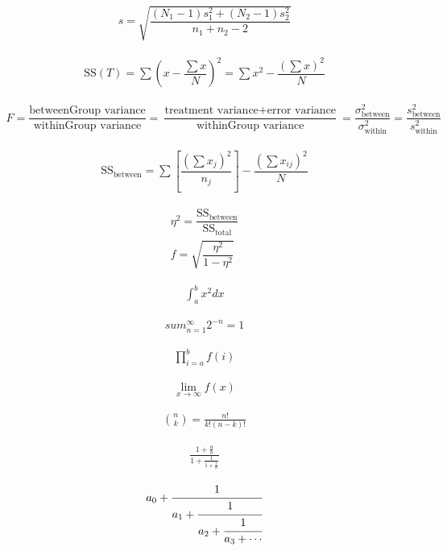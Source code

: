 \documentclass{article}
\begin{document}
\begin{align*}
s=\sqrt{\dfrac{(N_1-1)s_1^2+(N_2-1)s_2^2}{n_1+n_2-2}}
\end{align*}

\begin{align*}
\text{SS}(T)=\displaystyle\sum{\left(x-\dfrac{\sum{x}}{N}\right)^2}=\displaystyle\sum{x^2-\dfrac{\left(\sum{x}\right)^2}{N}}
\end{align*}

\begin{align*}
F=\dfrac{\text{betweenGroup variance}}{\text{withinGroup variance}}=\dfrac{\text{treatment variance}+\text{error variance}}{\text{withinGroup variance}}=\dfrac{\sigma^2_\text{between}}{\sigma^2_\text{within}}=\dfrac{s^2_\text{between}}{s^2_\text{within}}
\end{align*}

\begin{align*}
\text{SS}_\text{between}=\displaystyle\sum{\left[\dfrac{\left(\sum{x_j}\right)^2}{n_j}\right]}-\dfrac{(\sum{x_{ij}})^2}{N}
\end{align*}

\begin{align*}
\eta^2=\dfrac{\text{SS}_\text{between}}{\text{SS}_\text{total}} \\ f=\sqrt{\dfrac{\eta^2}{1-\eta^2}}
\end{align*}

\begin{align*}
\int_{a}^{b} x^2 dx
\end{align*}

\begin{align*}
sum_{n=1}^{\infty} 2^{-n} = 1
\end{align*}

\begin{align*}
\prod_{i=a}^{b} f(i)
\end{align*}

\begin{align*}
\lim_{x\to\infty} f(x)
\end{align*}

\begin{align*}
\binom{n}{k} = \frac{n!}{k!(n-k)!}
\end{align*}

\begin{align*}
\frac{1+\frac{a}{b}}{1+\frac{1}{1+\frac{1}{a}}}
\end{align*}

\begin{align*}
a_0+\cfrac{1}{a_1+\cfrac{1}{a_2+\cfrac{1}{a_3+\cdots}}}
\end{align*}
\end{document}
